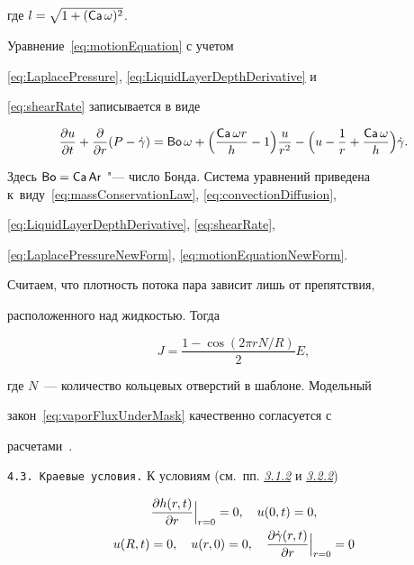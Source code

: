 где $l=\sqrt{1+(\mathop{\mathsf{Ca}} \omega)^2}$.



Уравнение~\eqref{eq:motionEquation} с учетом

\eqref{eq:LaplacePressure}, \eqref{eq:LiquidLayerDepthDerivative} и

\eqref{eq:shearRate} записывается в виде

\begin{equation}\label{eq:motionEquationNewForm}

\frac{\partial u}{\partial t} + \frac{\partial }{\partial r}

( P - \dgamma ) = \Bo \omega  + \Bigl( \frac{\Ca \omega r}{h} - 1

\Bigr)\frac{u}{r^2} - \Bigl(u - \frac{1}{r} + \frac{\Ca \omega }{h}

\Bigr)\dgamma.

\end{equation}

Здесь $\mathop{\mathsf{Bo}} = \mathop{\mathsf{Ca}} \mathop{\mathsf{Ar}}$ "--- число Бонда. Система уравнений приведена к~виду~\eqref{eq:massConservationLaw}, \eqref{eq:convectionDiffusion},

\eqref{eq:LiquidLayerDepthDerivative}, \eqref{eq:shearRate},

\eqref{eq:LaplacePressureNewForm}, \eqref{eq:motionEquationNewForm}.



Считаем, что плотность потока пара зависит лишь от препятствия,

расположенного над жидкостью. Тогда

\begin{equation}\label{eq:vaporFluxUnderMask}

J = \frac{1 - \cos \left( 2\pi rN/R \right)}{2}E,

\end{equation}

где $N$~--- количество кольцевых отверстий в шаблоне. Модельный

закон~\eqref{eq:vaporFluxUnderMask} качественно согласуется с

расчетами~\cite{Harris2007}.



\smallskip



\hypertarget{kol:4.3}{}

\texttt{4.3. Краевые условия.} К условиям  (см.~пп. \hyperlink{kol:3.1.2}{{\it 3.1.2}\/} и \hyperlink{kol:3.2.2}{{\it 3.2.2}\/}) 

\begin{gather*}

\frac{\partial h(r, t)}{\partial r} \Big|_{r=0}= 0, \quad u(0, t) = 0, 

\\

u(R, t) = 0,\quad  u(r, 0) = 0, \quad  \frac{\partial \dgamma (r,t)}

{ \partial r}\Big|_{r=0} = 0 

\end{gather*} 

